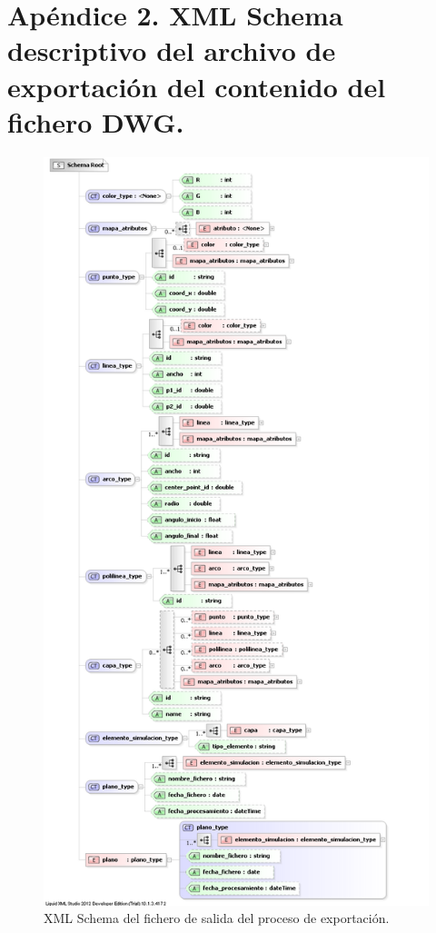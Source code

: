 \section{Apéndice 2. XML Schema descriptivo del archivo de exportación del contenido del fichero DWG.}

%
\begin{figure}[H]
\begin{center}
\includegraphics[height=\textheight]{imgs/XSD_v3}
\caption{XML Schema del fichero de salida del proceso de exportación.}
\end{center}
\end{figure}

